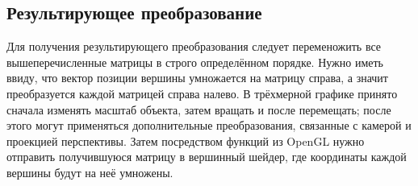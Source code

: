     \subsection{Результирующее преобразование}
Для получения результирующего преобразования следует переменожить все вышеперечисленные матрицы 
в строго определённом порядке. Нужно иметь ввиду, что вектор позиции вершины умножается на матрицу справа, 
а значит преобразуется каждой матрицей справа налево. В трёхмерной графике принято сначала изменять масштаб объекта, 
затем вращать и после перемещать; после этого могут применяться дополнительные преобразования, связанные с камерой 
и проекцией перспективы. Затем посредством функций из OpenGL нужно отправить получившуюся 
матрицу в вершинный шейдер, где координаты каждой вершины будут на неё умножены.